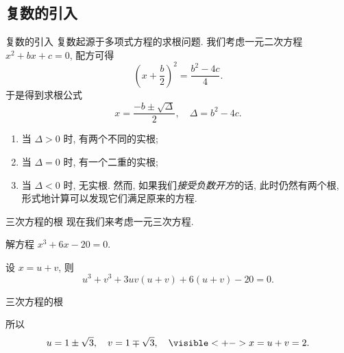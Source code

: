 \subsection{复数的引入}

\begin{frame}{复数的引入}
\onslide<+->复数起源于多项式方程的求根问题.
\onslide<+->我们考虑一元二次方程 $x^2+bx+c=0$,
\onslide<+->配方可得
	\[\left(x+\frac b2\right)^2=\frac{b^2-4c}4.\]
\onslide<+->于是得到求根公式
	\[x=\frac{-b\pm\sqrt\Delta}2,\quad \Delta=b^2-4c.\]
	\vspace{-\baselineskip}
\begin{enumerate}
\item 当 $\Delta>0$ 时, 有两个不同的实根;
\item 当 $\Delta=0$ 时, 有一个二重的实根;
\item 当 $\Delta<0$ 时, 无实根.
\onslide<+->然而, 如果我们\emph{接受负数开方}的话, 此时仍然有两个根, 形式地计算可以发现它们满足原来的方程.
\end{enumerate}
\end{frame}

\begin{frame}{三次方程的根}
\onslide<+->现在我们来考虑一元三次方程.
\onslide<+->
\begin{example}
解方程 $x^3+6x-20=0$.
\end{example}
\onslide<+->
\begin{solution}
设 $x=u+v$, 则
	\[u^3+v^3+3uv(u+v)+6(u+v)-20=0.\]
\visible<+->{我们希望
	\[u^3+v^3=20,\quad uv=-2,\]}%
\visible<+->{解得
	\[u^3=10\pm\sqrt{108}\visible<+->{=(1\pm\sqrt3)^3.}\]}
\vspace{-1.2\baselineskip}
\end{solution}
\end{frame}


\begin{frame}{三次方程的根}
\onslide<+->
\begin{solutionc}
\indent 所以 \[u=1\pm\sqrt3,\quad v=1\mp\sqrt 3,\quad
	\visible<+->{x=u+v=2.}\]
\vspace{-\baselineskip}
\end{solutionc}
\end{frame}


